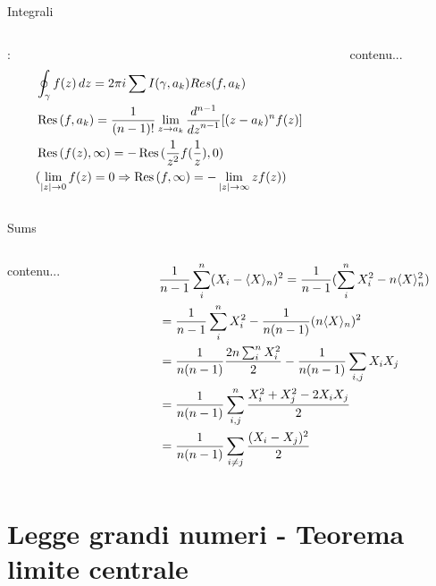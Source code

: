 \documentclass[asd-beamer.tex]{subfiles}%
\begin{document}
\begin{frame}{Integrali}\frameintoc
\begin{columns}[T]
\begin{column}{0.5\textwidth}
:
\begin{align*}
&\oint_{\gamma}f(z)\,dz=2\pi i\sum I(\gamma,a_k)Res(f,a_k)\\
&\operatorname{Res}{(f, a_k)}=\frac{1}{(n-1)!}\lim_{z\to a_k}\frac{d^{n-1}}{{d z}^{n-1}}[(z-a_k)^nf(z)]\\
&\operatorname{Res}{(f(z),\infty)}=-\operatorname{Res}{(\frac{1}{z^2}f(\frac{1}{z}),0)}\\
&(\lim_{|z|\to0}f(z)=0\Rightarrow\operatorname{Res}{(f,\infty)}=-\lim_{|z|\to\infty}zf(z))
\end{align*}
\end{column}
\begin{column}{0.5\textwidth}
	contenu...
\end{column}
\end{columns}
\end{frame}

\begin{frame}{Sums}
	\begin{columns}[T]
	\begin{column}{0.5\textwidth}
		contenu...
	\end{column}
	\begin{column}{0.5\textwidth}
	\begin{align*}
	&\frac{1}{n-1}\sum_i^n(X_i-\langle X \rangle_n)^2=\frac{1}{n-1}(\sum_i^nX_i^2-n\langle X \rangle_n^2)\\
	&=\frac{1}{n-1}\sum_i^nX_i^2-\frac{1}{n(n-1)}(n\langle X \rangle_n)^2\\
	&=\frac{1}{n(n-1)}\frac{2n\sum_i^nX_i^2}{2}-\frac{1}{n(n-1)}\sum_{i,j}X_iX_j\\
	&=\frac{1}{n(n-1)}\sum_{i,j}^n\frac{X_i^2+X_j^2-2X_iX_j}{2}\\
	&=\frac{1}{n(n-1)}\sum_{i\neq j}\frac{(X_i-X_j)^2}{2}
	\end{align*}
	\end{column}
	\end{columns}
\end{frame}

\section{Legge grandi numeri - Teorema limite centrale}
\end{document}
